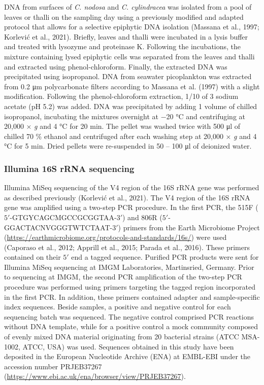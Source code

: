 \documentclass[
  12pt,
]{article}
\begin{document}
DNA from surfaces of \emph{C. nodosa} and \emph{C. cylindracea} was
isolated from a pool of leaves or thalli on the sampling day using a
previously modified and adapted protocol that allows for a selective
epiphytic DNA isolation (Massana et al., 1997; Korlević et al., 2021).
Briefly, leaves and thalli were incubated in a lysis buffer and treated
with lysozyme and proteinase K. Following the incubations, the mixture
containing lysed epiphytic cells was separated from the leaves and
thalli and extracted using phenol-chloroform. Finally, the extracted DNA
was precipitated using isopropanol. DNA from seawater picoplankton was
extracted from 0.2 \si{\um} polycarbonate filters according to Massana
et al. (1997) with a slight modification. Following the
phenol-chloroform extraction, 1/10 of 3 \si{\Molar} sodium acetate (pH
5.2) was added. DNA was precipitated by adding 1 volume of chilled
isopropanol, incubating the mixtures overnight at \num{-20}
\si{\degreeCelsius} and centrifuging at 20,000 × \emph{g} and 4
\si{\degreeCelsius} for 20 \si{\minute}. The pellet was washed twice
with 500 \si{\ul} of chilled 70 \si{\percent} ethanol and centrifuged
after each washing step at 20,000 × \emph{g} and 4 \si{\degreeCelsius}
for 5 \si{\minute}. Dried pellets were re-suspended in 50 -- 100
\si{\ul} of deionized water.

\hypertarget{illumina-16s-rrna-sequencing}{%
\subsubsection{Illumina 16S rRNA
sequencing}\label{illumina-16s-rrna-sequencing}}

Illumina MiSeq sequencing of the V4 region of the 16S rRNA gene was
performed as described previously (Korlević et al., 2021). The V4 region
of the 16S rRNA gene was amplified using a two-step PCR procedure. In
the first PCR, the 515F (\(5'\)-GTGYCAGCMGCCGCGGTAA-\(3'\)) and 806R
(\(5'\)-GGACTACNVGGGTWTCTAAT-\(3'\)) primers from the Earth Microbiome
Project (\url{https://earthmicrobiome.org/protocols-and-standards/16s/})
were used (Caporaso et al., 2012; Apprill et al., 2015; Parada et al.,
2016). These primers contained on their \(5'\) end a tagged sequence.
Purified PCR products were sent for Illumina MiSeq sequencing at IMGM
Laboratories, Martinsried, Germany. Prior to sequencing at IMGM, the
second PCR amplification of the two-step PCR procedure was performed
using primers targeting the tagged region incorporated in the first PCR.
In addition, these primers contained adapter and sample-specific index
sequences. Beside samples, a positive and negative control for each
sequencing batch was sequenced. The negative control comprised PCR
reactions without DNA template, while for a positive control a mock
community composed of evenly mixed DNA material originating from 20
bacterial strains (ATCC MSA-1002, ATCC, USA) was used. Sequences
obtained in this study have been deposited in the European Nucleotide
Archive (ENA) at EMBL-EBI under the accession number PRJEB37267
(\url{https://www.ebi.ac.uk/ena/browser/view/PRJEB37267}).
\end{document}
